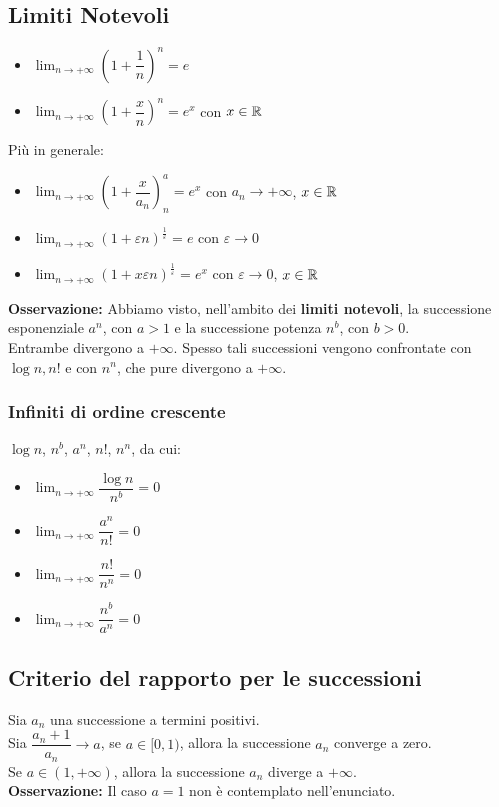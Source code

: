 \documentclass[../../main.tex]{subfiles}
\begin{document}
\subsection{Limiti Notevoli}
\begin{itemize}
    \item $\lim_{n\to+\infty} (1+\dfrac{1}{n})^n = e$
    \item $\lim_{n\to+\infty} (1+\dfrac{x}{n})^n = e^x$ con $x \in \mathbb{R}$
\end{itemize}
Più in generale:
\begin{itemize}
    \item $\lim_{n\to+\infty} (1+\dfrac{x}{a_n})^a_n = e^x$ con $a_n \to +\infty$, $x \in \mathbb{R}$
    \item $\lim_{n\to+\infty} (1+\varepsilon n)^{\frac{1}{\varepsilon}} = e$ con $\varepsilon \to 0$
    \item $\lim_{n\to+\infty} (1+x\varepsilon n)^{\frac{1}{\varepsilon}} = e^x$ con $\varepsilon \to 0$, $x \in \mathbb{R}$
\end{itemize}
\textbf{Osservazione:} Abbiamo visto, nell'ambito dei \textbf{limiti notevoli}, la successione esponenziale $a^n$, con $a > 1$ e la successione potenza $n^b$, con $b > 0$.\\
Entrambe divergono a $+\infty$. Spesso tali successioni vengono confrontate con $\log n, n!$ e con $n^n$, che pure divergono a $+\infty$.\\

\subsubsection{Infiniti di ordine crescente}
$\log n$, $n^b$, $a^n$, $n!$, $n^n$, da cui:
\begin{itemize}
    \item $\lim_{n\to+\infty} \dfrac{\log n}{n^b} = 0$
    \item $\lim_{n\to+\infty} \dfrac{a^n}{n!} = 0$
    \item $\lim_{n\to+\infty} \dfrac{n!}{n^n} = 0$
    \item $\lim_{n\to+\infty} \dfrac{n^b}{a^n} = 0$
\end{itemize}

\subsection{Criterio del rapporto per le successioni}
Sia $a_n$ una successione a termini positivi.\\ Sia $\dfrac{a_n+1}{a_n} \to a$,
se $a \in [0, 1)$, allora la successione $a_n$ converge a zero.\\ Se $a \in (1,
    +\infty)$, allora la successione $a_n$ diverge a $+\infty$.\\
\textbf{Osservazione:} Il caso $a = 1$ non è contemplato nell'enunciato.
\end{document}

